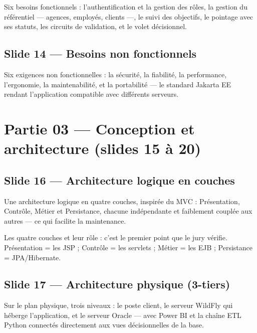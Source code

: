\documentclass[a4paper,11pt]{article}
\begin{document}
Six besoins fonctionnels : l'authentification et la gestion des rôles, la
gestion du référentiel --- agences, employés, clients ---, le suivi des
objectifs, le pointage avec ses statuts, les circuits de validation, et le
volet décisionnel.

\subsection*{Slide 14 --- Besoins non fonctionnels}

Six exigences non fonctionnelles : la sécurité, la fiabilité, la performance,
l'ergonomie, la maintenabilité, et la portabilité --- le standard Jakarta EE
rendant l'application compatible avec différents serveurs.

\section*{Partie 03 --- Conception et architecture (slides 15 à 20)}


\subsection*{Slide 16 --- Architecture logique en couches}

Une architecture logique en quatre couches, inspirée du MVC : Présentation,
Contrôle, Métier et Persistance, chacune indépendante et faiblement couplée aux
autres --- ce qui facilite la maintenance.

\begin{coeur}
Les quatre couches et leur rôle : c'est le premier point que le jury vérifie.
Présentation = les JSP ; Contrôle = les servlets ; Métier = les EJB ;
Persistance = JPA/Hibernate.
\end{coeur}

\subsection*{Slide 17 --- Architecture physique (3-tiers)}

Sur le plan physique, trois niveaux : le poste client, le serveur WildFly qui
héberge l'application, et le serveur Oracle --- avec Power BI et la chaîne ETL
Python connectés directement aux vues décisionnelles de la base.
\end{document}
